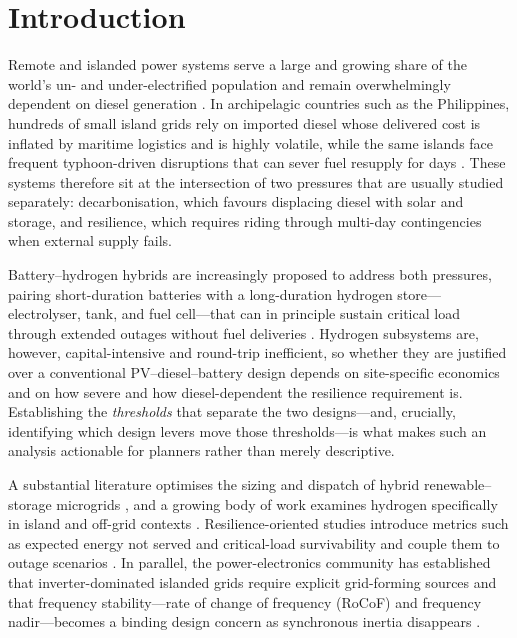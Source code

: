 \documentclass[preprint,12pt]{elsarticle}
\begin{document}
\section{Introduction}
\label{sec:intro}

Remote and islanded power systems serve a large and growing share of the world's
un- and under-electrified population and remain overwhelmingly dependent on
diesel generation \cite{hirsch_2018_microgrids_review,akinyele_2018_remote_microgrid_challenges}.
In archipelagic countries such as the Philippines, hundreds of small island grids
rely on imported diesel whose delivered cost is inflated by maritime logistics and
is highly volatile, while the same islands face frequent typhoon-driven
disruptions that can sever fuel resupply for days
\cite{ocon_bertheau_2019_philippines_diesel_pvbatt,castro_2022_634_islands_hres,castro_2023_busuanga_resilience}.
These systems therefore sit at the intersection of two pressures that are usually
studied separately: decarbonisation, which favours displacing diesel with solar
and storage, and resilience, which requires riding through multi-day
contingencies when external supply fails.

Battery--hydrogen hybrids are increasingly proposed to address both pressures,
pairing short-duration batteries with a long-duration hydrogen store---electrolyser,
tank, and fuel cell---that can in principle sustain critical load through extended
outages without fuel deliveries
\cite{alzahrani_2022_hydrogen_microgrid_review,van_2023_hydrogen_microgrid_review,staadecker_2024_ldes_value}.
Hydrogen subsystems are, however, capital-intensive and round-trip inefficient, so
whether they are justified over a conventional PV--diesel--battery design depends
on site-specific economics and on how severe and how diesel-dependent the
resilience requirement is. Establishing the \emph{thresholds} that separate the
two designs---and, crucially, identifying which design levers move those
thresholds---is what makes such an analysis actionable for planners rather than
merely descriptive.

A substantial literature optimises the sizing and dispatch of hybrid
renewable--storage microgrids
\cite{pascasio_2021_philippines_pv_wind,castro_2024_208_islands_transition,meschede2019transferability},
and a growing body of work examines hydrogen specifically in island and off-grid
contexts \cite{tatti_2024_hydrogen_offgrid_case,alharbi2025comparative,qi_2025_h2_battery_dispatch}.
Resilience-oriented studies introduce metrics such as expected energy not served
and critical-load survivability and couple them to outage scenarios
\cite{marqusee2021resilience,gao_2016_critical_load_restoration,raoufi_2020_power_resilience_metrics,amiri_2024_resilience_framework}.
In parallel, the power-electronics community has established that
inverter-dominated islanded grids require explicit grid-forming sources and that
frequency stability---rate of change of frequency (RoCoF) and frequency
nadir---becomes a binding design concern as synchronous inertia disappears
\cite{liu2016comparison,shahgholian2025droop,chamorro2020innovative,olasoji2024review}.
\end{document}
